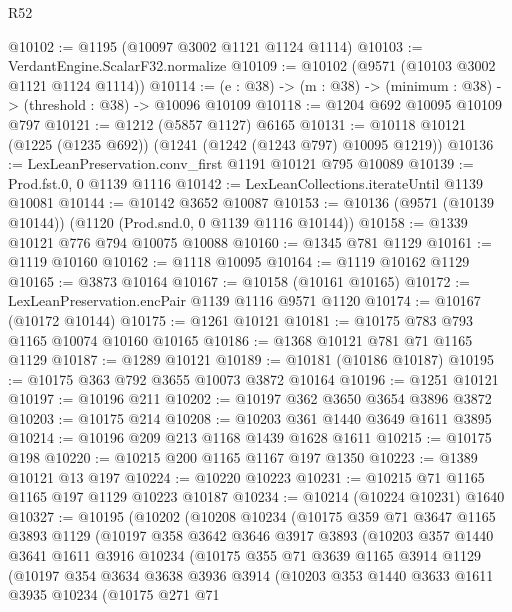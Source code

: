 \begin{lexlean}{R52}
\begin{coremodule}
@10102 := @1195 (@10097 @3002 @1121 @1124 @1114)
@10103 := VerdantEngine.ScalarF32.normalize
@10109 := @10102 (@9571 (@10103 @3002 @1121 @1124 @1114))
@10114 := (e : @38) -> (m : @38) -> (minimum : @38) -> (threshold : @38) -> @10096 @10109
@10118 := @1204 @692 @10095 @10109 @797
@10121 := @1212 (@5857 @1127) @6165
@10131 := @10118 @10121 (@1225 (@1235 @692)) (@1241 (@1242 (@1243 @797) @10095 @1219))
@10136 := LexLeanPreservation.conv_first @1191 @10121 @795 @10089
@10139 := Prod.fst.{0, 0} @1139 @1116
@10142 := LexLeanCollections.iterateUntil @1139 @10081
@10144 := @10142 @3652 @10087
@10153 := @10136 (@9571 (@10139 @10144)) (@1120 (Prod.snd.{0, 0} @1139 @1116 @10144))
@10158 := @1339 @10121 @776 @794 @10075 @10088
@10160 := @1345 @781 @1129
@10161 := @1119 @10160
@10162 := @1118 @10095
@10164 := @1119 @10162 @1129
@10165 := @3873 @10164
@10167 := @10158 (@10161 @10165)
@10172 := LexLeanPreservation.encPair @1139 @1116 @9571 @1120
@10174 := @10167 (@10172 @10144)
@10175 := @1261 @10121
@10181 := @10175 @783 @793 @1165 @10074 @10160 @10165
@10186 := @1368 @10121 @781 @71 @1165 @1129
@10187 := @1289 @10121
@10189 := @10181 (@10186 @10187)
@10195 := @10175 @363 @792 @3655 @10073 @3872 @10164
@10196 := @1251 @10121
@10197 := @10196 @211
@10202 := @10197 @362 @3650 @3654 @3896 @3872
@10203 := @10175 @214
@10208 := @10203 @361 @1440 @3649 @1611 @3895
@10214 := @10196 @209 @213 @1168 @1439 @1628 @1611
@10215 := @10175 @198
@10220 := @10215 @200 @1165 @1167 @197 @1350
@10223 := @1389 @10121 @13 @197
@10224 := @10220 @10223
@10231 := @10215 @71 @1165 @1165 @197 @1129 @10223 @10187
@10234 := @10214 (@10224 @10231) @1640
@10327 := @10195
    (@10202
      (@10208
        @10234
        (@10175
          @359
          @71
          @3647
          @1165
          @3893
          @1129
          (@10197
            @358
            @3642
            @3646
            @3917
            @3893
            (@10203
              @357
              @1440
              @3641
              @1611
              @3916
              @10234
              (@10175
                @355
                @71
                @3639
                @1165
                @3914
                @1129
                (@10197
                  @354
                  @3634
                  @3638
                  @3936
                  @3914
                  (@10203
                    @353
                    @1440
                    @3633
                    @1611
                    @3935
                    @10234
                    (@10175
                      @271
                      @71

\end{coremodule}
\end{lexlean}
